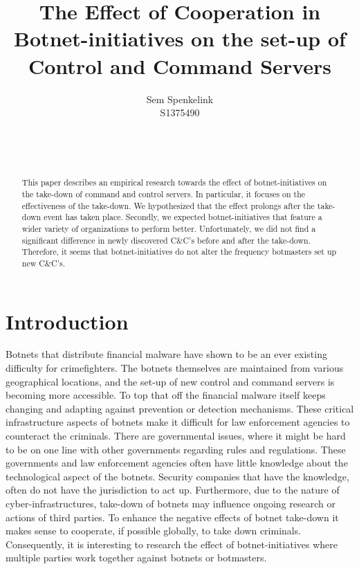 \documentclass{sig-alternate-br}
\begin{document}
\title{The Effect of Cooperation in Botnet-initiatives on the set-up of Control and Command Servers}
\author{
\alignauthor
Sem Spenkelink\\
S1375490\\
       \\
       \\
       \\
}

\maketitle
\begin{abstract}
This paper describes an empirical research towards the effect of botnet-initiatives on the take-down of command and control servers. In particular, it focuses on the effectiveness of the take-down. We hypothesized that the effect prolongs after the take-down event has taken place. Secondly, we expected botnet-initiatives that feature a wider variety of organizations to perform better. Unfortunately, we did not find a significant difference in newly discovered C\&C's before and after the take-down. Therefore, it seems that botnet-initiatives do not alter the frequency botmasters set up new C\&C's.
\end{abstract}


\section{Introduction}
Botnets that distribute financial malware have shown to be an ever existing difficulty for crimefighters. The botnets themselves are maintained from various geographical locations, and the set-up of new control and command servers is becoming more accessible. To top that off the financial malware itself keeps changing and adapting against prevention or detection mechanisms. These critical infrastructure aspects of botnets make it difficult for law enforcement agencies to counteract the criminals. There are governmental issues, where it might be hard to be on one line with other governments regarding rules and regulations. These governments and law enforcement agencies often have little knowledge about the technological aspect of the botnets. Security companies that have the knowledge, often do not have the jurisdiction to act up. Furthermore, due to the nature of cyber-infrastructures, take-down of botnets may influence ongoing research or actions of third parties. To enhance the negative effects of botnet take-down it makes sense to cooperate, if possible globally, to take down criminals. Consequently, it is interesting to research the effect of botnet-initiatives where multiple parties work together against botnets or botmasters.
\end{document}

